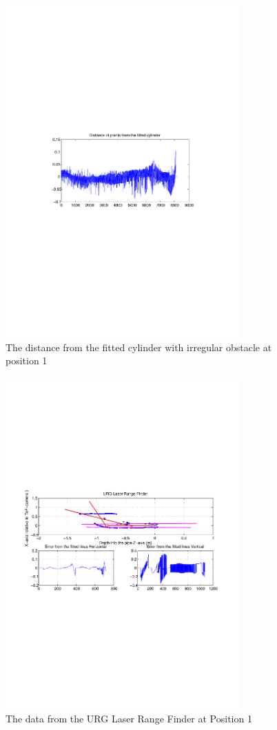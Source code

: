 \begin{figure}[htbp]
    \centering
    \includegraphics[width=0.8\textwidth]{pics/pos1-irregular-tof-dist}
    \caption{The distance from the fitted cylinder with irregular obstacle at position 1}
    \label{chap7:fig-pos1-irregular-tof-dits}
\end{figure}
\begin{figure}[htbp]
    \centering
    \includegraphics[width=0.8\textwidth]{pics/pos1-irregular-urg-2d}
    \caption{The data from the URG Laser Range Finder at Position 1}
    \label{chap7:fig-pos1-irregular-urg-2d}
\end{figure}
